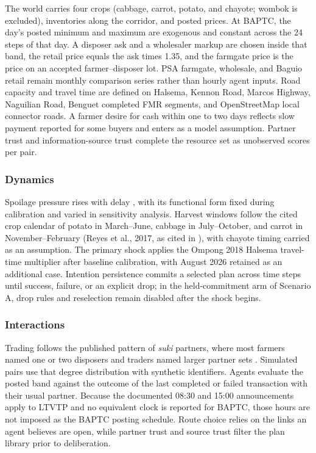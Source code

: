 \documentclass{icsthesis}
\begin{document}
\begin{mainmatter}
			The world carries four crops (cabbage, carrot, potato, and chayote; wombok is excluded), inventories along the corridor, and posted prices. At BAPTC, the day's posted minimum and maximum are exogenous and constant across the 24 steps of that day. A disposer ask and a wholesaler markup are chosen inside that band, the retail price equals the ask times 1.35, and the farmgate price is the price on an accepted farmer--disposer lot. PSA farmgate, wholesale, and Baguio retail remain monthly comparison series rather than hourly agent inputs. Road capacity and travel time are defined on Halsema, Kennon Road, Marcos Highway, Naguilian Road, Benguet completed FMR segments, and OpenStreetMap local connector roads. A farmer desire for cash within one to two days reflects slow payment reported for some buyers and enters as a model assumption. Partner trust and information-source trust complete the resource set as unobserved scores per pair.

			\subsubsection{Dynamics}

			Spoilage pressure rises with delay \citep{Antolin2024,Fernandez2004}, with its functional form fixed during calibration and varied in sensitivity analysis. Harvest windows follow the cited crop calendar of potato in March--June, cabbage in July--October, and carrot in November--February (Reyes et al., 2017, as cited in \citealp{deGuzmanBambicoBaconguis2023}), with chayote timing carried as an assumption. The primary shock applies the Ompong 2018 Halsema travel-time multiplier after baseline calibration, with August 2026 retained as an additional case. Intention persistence commits a selected plan across time steps until success, failure, or an explicit drop; in the held-commitment arm of Scenario A, drop rules and reselection remain disabled after the shock begins.

			\subsubsection{Interactions}

			Trading follows the published pattern of \emph{suki} partners, where most farmers named one or two disposers and traders named larger partner sets \citep{deGuzmanBambicoBaconguis2023}. Simulated pairs use that degree distribution with synthetic identifiers. Agents evaluate the posted band against the outcome of the last completed or failed transaction with their usual partner. Because the documented 08:30 and 15:00 announcements apply to LTVTP and no equivalent clock is reported for BAPTC, those hours are not imposed as the BAPTC posting schedule. Route choice relies on the links an agent believes are open, while partner trust and source trust filter the plan library prior to deliberation.


\end{mainmatter}
\end{document}
